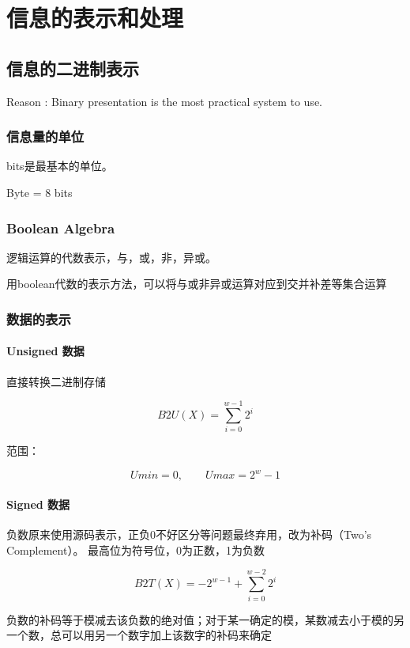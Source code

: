 \section{信息的表示和处理}

\subsection{信息的二进制表示}

Reason : Binary presentation is the most practical system to use.

\subsubsection{信息量的单位}

bits是最基本的单位。

Byte = 8 bits

\subsubsection{Boolean Algebra}
逻辑运算的代数表示，与，或，非，异或。

用boolean代数的表示方法，可以将与或非异或运算对应到交并补差等集合运算

\subsubsection{数据的表示}

\paragraph{Unsigned 数据}

直接转换二进制存储

\[
B2U(X) = \sum_{i = 0}^{w - 1} 2 ^ i 
\]

范围：

\[
Umin = 0 ,\qquad
Umax = 2^{w} - 1
\]
\paragraph{Signed 数据}

负数原来使用源码表示，正负0不好区分等问题最终弃用，改为补码（Two's Complement）。
最高位为符号位，0为正数，1为负数

\[
B2T(X) = -2 ^ {w - 1} + \sum_{i = 0}^{w - 2} 2 ^ i 
\]

负数的补码等于模减去该负数的绝对值；对于某一确定的模，某数减去小于模的另一个数，总可以用另一个数字加上该数字的补码来确定

